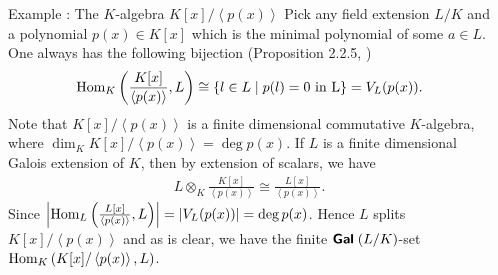 \documentclass[final,20pt]{beamer}
\newcommand{\gen}[1]{\left \langle#1\right \rangle}
\newcommand{\isomorph}{\cong}
\newcommand{\Gal}[1]{{\fontfamily{lmss}\selectfont 
		\text{\textbf{Gal}} \;#1
}}
\newcommand{\abs}[1]{\left \vert #1 \right \vert}
\newcommand{\tens}{\otimes}
\newcommand{\homset}[3]{{\fontfamily{lmr}\selectfont 
		\text{\rm Hom}_{#1}\left (#2,#3\right )
}}
\begin{document}
\begin{frame}
\begin{columns}[t]
\begin{column}{.32\linewidth}
%			
		\begin{block}{Example : {The $K$-algebra $K[x]/\gen{p(x)}$}}
			Pick any field extension $L/K$ and a polynomial $p(x) \in K[x]$ which is the minimal polynomial of some $a\in L$. One always has the following bijection (Proposition 2.2.5, \cite{GT})
				\begin{align*}
					\homset{K}{\frac{K[x]}{\gen{p(x)}}}{L} \isomorph \{l\in L\;\vert\; p(l)  = 0 \text{ in L}\} = V_L(p(x)).
				\end{align*}
			Note that $K[x]/\gen{p(x)} $ is a finite dimensional commutative $K$-algebra, where $\dim_K K[x]/\gen{p(x)}  = \deg p(x)$. If $L$ is a finite dimensional Galois extension of $K$, then by extension of scalars, we have
			\begin{align*}
				L\tens_K \frac{K[x]}{\gen{p(x)}} \isomorph \frac{L[x]}{\gen{p(x)}}.
			\end{align*}
			Since $\abs{\homset{L}{\frac{L[x]}{\gen{p(x)}}}{L} } = \abs{V_L(p(x))} = \deg p(x)$. Hence $L$ splits $K[x]/\gen{p(x)}$ and as is clear, we have the finite $\Gal{(L/K)}$-set $\homset{K}{K[x]/\gen{p(x)}}{L}$.
		\end{block}
	\end{column}



\begin{column}{.32\linewidth}


\end{column}
\end{columns}
\end{frame}
\end{document}
